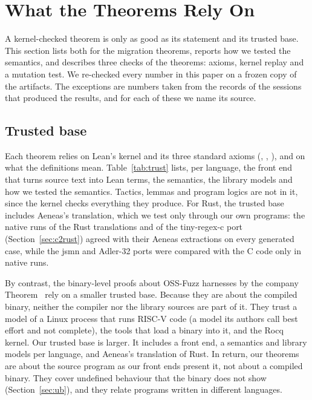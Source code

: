 \section{What the Theorems Rely On}
\label{sec:trust}

A kernel-checked theorem is only as good as its statement and its trusted base. This section lists both for the
migration theorems, reports how we tested the semantics, and describes three checks of the theorems: axioms, kernel
replay and a mutation test. We re-checked every number in this paper on a frozen copy of the artifacts. The exceptions are numbers taken from
the records of the sessions that produced the results, and for each of these we name its source.

\subsection{Trusted base}

Each theorem relies on Lean's kernel and its three standard axioms (, ,
), and on what the definitions mean. Table~\ref{tab:trust} lists, per language, the front end that
turns source text into Lean terms, the semantics, the library models and how we tested the semantics. Tactics, lemmas
and program logics are not in it, since the kernel checks everything they produce. For Rust, the trusted base includes
Aeneas's translation, which we test only through our own programs: the native runs of the Rust translations and of the
tiny-regex-c port (Section~\ref{sec:c2rust}) agreed with their Aeneas extractions on every generated case, while the
jsmn and Adler-32 ports were compared with the C code only in native runs.

By contrast, the binary-level proofs about OSS-Fuzz harnesses by the company Theorem~\cite{theoremossverify} rely on a
smaller trusted base. Because
they are about the compiled binary, neither the compiler nor the library sources are part of it. They trust a model of
a Linux process that runs RISC-V code (a model its authors call best effort and not complete), the tools that load a
binary into it, and the Rocq kernel. Our trusted base is larger. It includes a front end, a semantics and library
models per language, and Aeneas's translation of Rust. In return, our theorems are about the source program as our front ends present it, not about a compiled binary. They cover
undefined behaviour that the binary does not show (Section~\ref{sec:ub}), and they relate programs written in different
languages.

